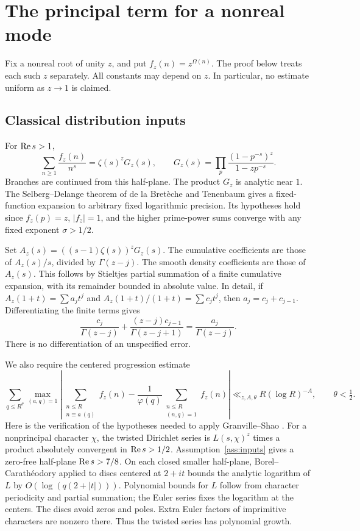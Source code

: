 \section{The principal term for a nonreal mode}\label{sec:model}

Fix a nonreal root of unity $z$, and put $f_z(n)=z^{\Omega(n)}$.
The proof below treats each such $z$ separately. All constants may
depend on $z$. In particular, no estimate uniform as $z\to1$ is claimed.

\subsection{Classical distribution inputs}

For $\operatorname{Re} s>1$,
\begin{equation}\label{eq:euler}
 \sum_{n\geq1}\frac{f_z(n)}{n^s}=\zeta(s)^zG_z(s),\qquad
 G_z(s)=\prod_p\frac{(1-p^{-s})^z}{1-zp^{-s}}.
\end{equation}
Branches are continued from this half-plane. The product $G_z$ is
analytic near $1$. The Selberg--Delange theorem of de la Bret\`eche
and Tenenbaum \cite[Theorem 1.2 and equation (1.10)]{BT} gives a
fixed-function expansion to arbitrary fixed logarithmic precision.
Its hypotheses hold since $f_z(p)=z$, $|f_z|=1$, and the higher
prime-power sums converge with any fixed exponent $\sigma>1/2$.

Set $A_z(s)=((s-1)\zeta(s))^zG_z(s)$. The cumulative coefficients
are those of $A_z(s)/s$, divided by $\Gamma(z-j)$. The smooth
density coefficients are those of $A_z(s)$. This follows by
Stieltjes partial summation of a finite cumulative expansion, with
its remainder bounded in absolute value. In detail, if
$A_z(1+t)=\sum a_jt^j$ and $A_z(1+t)/(1+t)=\sum c_jt^j$, then
$a_j=c_j+c_{j-1}$. Differentiating the finite terms gives
\[
 \frac{c_j}{\Gamma(z-j)}+
 \frac{(z-j)c_{j-1}}{\Gamma(z-j+1)}
 =\frac{a_j}{\Gamma(z-j)}.
\]
There is no differentiation of an unspecified error.

We also require the centered progression estimate
\begin{equation}\label{eq:bvz}
 \sum_{q\leq R^\theta}\max_{(a,q)=1}
 \left|\sum_{\substack{n\leq R\\n\equiv a\ (q)}}f_z(n)
 -\frac1{\varphi(q)}\sum_{\substack{n\leq R\\(n,q)=1}}f_z(n)\right|
 \ll_{z,A,\theta}R(\log R)^{-A},\qquad\theta<\tfrac12.
\end{equation}
Here is the verification of the hypotheses needed to apply
Granville--Shao \cite[Theorem 1.1(b)]{GS}.
For a nonprincipal character $\chi$, the twisted Dirichlet series
is $L(s,\chi)^z$ times a product absolutely convergent in
$\operatorname{Re} s>1/2$. Assumption~\ref{ass:inputs} gives a zero-free
half-plane $\operatorname{Re} s>7/8$. On each closed smaller half-plane,
Borel--Carath\'eodory applied to discs centered at $2+it$ bounds the
analytic logarithm of $L$ by $O(\log(q(2+|t|)))$. Polynomial bounds
for $L$ follow from character periodicity and partial summation;
the Euler series fixes the logarithm at the centers. The discs avoid
zeros and poles. Extra Euler factors of imprimitive characters are
nonzero there. Thus the twisted series has polynomial growth.

